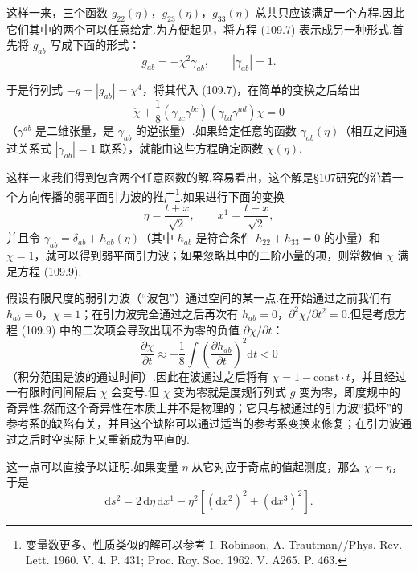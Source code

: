 这样一来，三个函数 $g_{22}(\eta)$，$g_{23}(\eta)$，$g_{33}(\eta)$ 总共只应该满足一个方程.因此它们其中的两个可以任意给定.为方便起见，将方程 (109.7) 表示成另一种形式.首先将 $g_{ab}$ 写成下面的形式：
\begin{equation}
  g_{ab}=-\chi^{2}\gamma_{ab},\qquad|\gamma_{ab}|=1.
\end{equation}

于是行列式 $-g=|g_{ab}|=\chi^{4}$，将其代入 (109.7)，在简单的变换之后给出
\begin{equation}
  \ddot{\chi}
  +\frac{1}{8}(\dot{\gamma}_{ac}\gamma^{bc})
  (\dot{\gamma}_{bd}\gamma^{ad})\chi=0
\end{equation}
（$\gamma^{ab}$ 是二维张量，是 $\gamma_{ab}$ 的逆张量）.如果给定任意的函数 $\gamma_{ab}(\eta)$（相互之间通过关系式 $|\gamma_{ab}|=1$ 联系），就能由这些方程确定函数 $\chi(\eta)$.

这样一来我们得到包含两个任意函数的解.容易看出，这个解是§107研究的沿着一个方向传播的弱平面引力波的推广\footnote{变量数更多、性质类似的解可以参考 I. Robinson, A. Trautman//Phys. Rev. Lett. 1960. V. 4. P. 431; Proc. Roy. Soc. 1962. V. A265. P. 463.}.如果进行下面的变换
\begin{equation*}
  \eta=\frac{t+x}{\sqrt{2}},
  \qquad
  x^{1}=\frac{t-x}{\sqrt{2}},
\end{equation*}
并且令 $\gamma_{ab}=\delta_{ab}+h_{ab}(\eta)$（其中 $h_{ab}$ 是符合条件 $h_{22}+h_{33}=0$ 的小量）和 $\chi=1$，就可以得到弱平面引力波；如果忽略其中的二阶小量的项，则常数值 $\chi$ 满足方程 (109.9).

假设有限尺度的弱引力波（“波包”）通过空间的某一点.在开始通过之前我们有 $h_{ab}=0$，$\chi=1$；在引力波完全通过之后再次有 $h_{ab}=0$，$\partial^{2}\chi/\partial t^{2}=0$.但是考虑方程 (109.9) 中的二次项会导致出现不为零的负值 $\partial\chi/\partial t$：
\begin{equation*}
  \frac{\partial\chi}{\partial t}\approx
  -\frac{1}{8}\int\left(\frac{\partial h_{ab}}{\partial t}\right)^{2}
  \mathrm{d}t<0
\end{equation*}
（积分范围是波的通过时间）.因此在波通过之后将有 $\chi=1-\mathrm{const}\cdot t$，并且经过一有限时间间隔后 $\chi$ 会变号.但 $\chi$ 变为零就是度规行列式 $g$ 变为零，即度规中的奇异性.然而这个奇异性在本质上并不是物理的；它只与被通过的引力波“损坏”的参考系的缺陷有关，并且这个缺陷可以通过适当的参考系变换来修复；在引力波通过之后时空实际上又重新成为平直的.

这一点可以直接予以证明.如果变量 $\eta$ 从它对应于奇点的值起测度，那么 $\chi=\eta$，于是
\begin{equation*}
  \mathrm{d}s^{2}=2\,\mathrm{d}\eta\,\mathrm{d}x^{1}
  -\eta^{2}\left[(\mathrm{d}x^{2})^{2}+(\mathrm{d}x^{3})^{2}\right].
\end{equation*}

